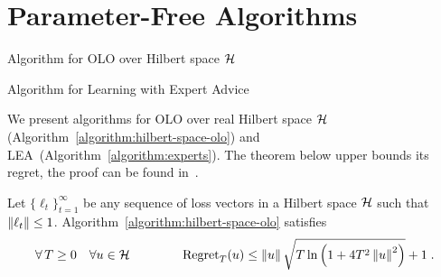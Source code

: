 \section{Parameter-Free Algorithms}


\begin{algorithm}[t]
\caption{Algorithm for OLO over Hilbert space $\mathcal{H}$
\label{algorithm:hilbert-space-olo}}
\begin{algorithmic}
{
\ENDFOR
}
\end{algorithmic}
\end{algorithm}

\begin{algorithm}[t]
\begin{algorithmic}
\caption{Algorithm for Learning with Expert Advice \label{algorithm:experts}}
{
\ENDFOR
}
\end{algorithmic}
\end{algorithm}

We present algorithms for \ac{OLO} over real Hilbert space $\mathcal{H}$
(Algorithm~\ref{algorithm:hilbert-space-olo}) and
\ac{LEA}~(Algorithm~\ref{algorithm:experts}).  The theorem below upper bounds
its regret, the proof can be found in~\cite{Orabona-Pal-2016-parameter-free}.

\begin{theorem}
\label{theorem:hilbert-space-olo-regret}
Let $\{\ell_t\}_{t=1}^\infty$ be any sequence of loss vectors
in a Hilbert space $\mathcal{H}$ such that $\left\|{\ell_t}\right\| \le 1$.
Algorithm~\ref{algorithm:hilbert-space-olo} satisfies
$$
\forall \, T \ge 0 \quad
\forall u \in \mathcal{H} \qquad \qquad
\operatorname{Regret}_T(u) \le \left\|{u}\right\| \sqrt{T \ln\left(1 + 4T^2 \left\|{u}\right\|^2 \right)} + 1 \;.
$$
\end{theorem}

